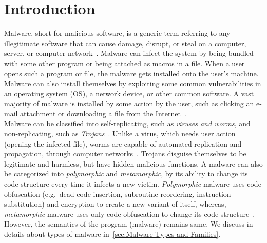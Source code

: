 \chapter{Introduction}\label{chapter:introduction}
Malware, short for malicious software, is a generic term referring to any illegitimate software that can cause damage, disrupt, or steal on a computer, server, or computer network~\cite[]{ciscodif}.
Malware can infect the system by being bundled with some other program or being attached as macros in a file.
When a user opens such a program or file, the malware gets installed onto the user's machine.
Malware can also install themselves by exploiting some common vulnerabilities in an operating system (OS), a network device, or other common software.
A vast majority of malware is installed by some action by the user, such as clicking an e-mail attachment or downloading a file from the Internet~\cite[]{ciscodif}.\\

Malware can be classified into self-replicating, such as \emph{viruses and worms}, and non-replicating, such as \emph{Trojans}~\cite[]{malsoft}.
Unlike a virus, which needs user action (opening the infected file), worms are capable of automated replication and propagation, through computer networks~\cite[]{malsoft}.
Trojans disguise themselves to be legitimate and harmless, but have hidden malicious functions.
A malware can also be categorized into \emph{polymorphic} and \emph{metamorphic}, by its ability to change its code-structure every time it infects a new victim.
\emph{Polymorphic} malware uses code obfuscation (e.g.\ dead-code insertion, subroutine reordering, instruction substitution) and encryption to create a new variant of itself, whereas,
\emph{metamorphic} malware uses only code obfuscation to change its code-structure~\cite[]{rad2011evolution,rad2012camouflage}.
However, the semantics of the program (malware) remains same.
We discuss in details about types of malware in~\autoref{sec:Malware Types and Families}.\\

